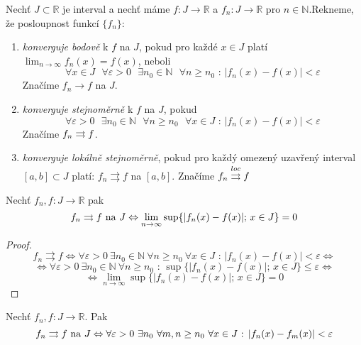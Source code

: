 \begin{definice}
Nechť $J \subset \mathbb{R}$ je interval a nechť máme $f : J \rightarrow \mathbb{R}$ a $f_n : J \rightarrow \mathbb{R}$ pro $n \in \mathbb{N}$.Rekneme, že posloupnost funkcí $\{f_n\}$:

\begin{enumerate}
\item \emph{konverguje bodově} k $f$ na $J$, pokud pro každé $x \in J$ platí $\lim_{n \rightarrow \infty} f_n(x) = f(x)$, neboli
$$\forall x \in J \textrm{ } \forall \varepsilon > 0 \textrm{ } \exists n_0 \in \mathbb{N} \textrm{ } \forall n \geq n_0 \textrm{ : } |f_n(x) - f(x)| < \varepsilon$$
Značíme $f_n \rightarrow f$ na $J$.
\item \emph{konverguje stejnoměrně} k $f$ na $J$, pokud
$$\forall \varepsilon > 0 \textrm{ } \exists n_0 \in \mathbb{N} \textrm{ } \forall n \geq n_0 \textrm{ } \forall x \in J \textrm{ : } | f_n(x) - f(x) | < \varepsilon$$
Značíme $f_n \rightrightarrows f$.
\item \emph{konverguje lokálně stejnoměrně}, pokud pro každý omezený uzavřený interval $[a, b] \subset J$ platí: $f_n \rightrightarrows f$ na $[a, b]$. Značíme $f_n \overset{loc}{\rightrightarrows} f$
\end{enumerate}
\end{definice}

\begin{vetal}
Nechť $f_n, f:J \rightarrow \mathbb{R}$ pak
$$f_n \rightrightarrows f \textrm{ na } J \Leftrightarrow \lim_{n \rightarrow \infty} \sup \{ |f_n(x) - f(x)| \textrm{; } x \in J \} = 0$$
\end{vetal}

\begin{proof}
$$ f_n \rightrightarrows f \Leftrightarrow \forall \varepsilon > 0 \  \exists n_0 \in \mathbb{N} \  \forall n \geq n_0 \  \forall x \in J \textrm{ : } |f_n(x) - f(x)| < \varepsilon \Leftrightarrow$$
$$\Leftrightarrow \forall \varepsilon > 0 \  \exists n_0 \in \mathbb{N} \  \forall n \geq n_0 \textrm{ : } \sup \{ |f_n(x) - f(x) | \textrm{; } x \in J \} \leq \varepsilon \Leftrightarrow$$
$$\Leftrightarrow \lim_{n \to \infty} \sup\{|f_n(x)-f(x)| \textrm{; } x \in J\} = 0$$
\end{proof}

\begin{vetat}
Nechť $f_n,f : J \rightarrow \mathbb{R}$. Pak
$$f_n \rightrightarrows f \textrm{ na } J \Leftrightarrow \forall \varepsilon > 0 \  \exists n_0 \  \forall m,n \geq n_0 \  \forall x \in J \textrm{ : } | f_n(x) - f_m(x)| < \varepsilon$$
\end{vetat}

